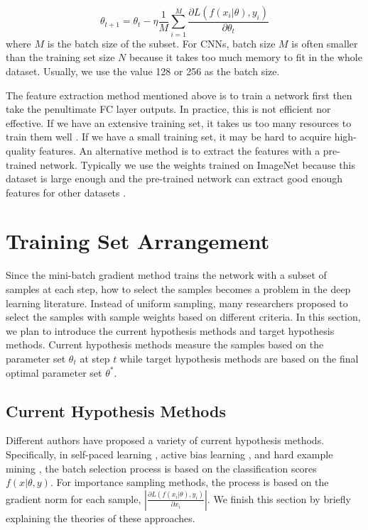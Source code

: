 \begin{equation}
	\theta_{t+1} = \theta_t - \eta \frac{1}{M} \sum_{i=1}^{M}
 \frac{\partial{L(f(x_i|\theta), y_i)}}{\partial{\theta_t}}
\end{equation}
where $M$ is the batch size of the subset. For CNNs, batch size $M$ is often smaller than the training set size $N$ because it takes too much memory to fit in the whole dataset. Usually, we use the value 128 or 256 as the batch size. 

The feature extraction method mentioned above is to train a network first then take the penultimate FC layer outputs. In practice, this is not efficient nor effective. If we have an extensive training set, it takes us too many resources to train them well \cite{Chen2016}. If we have a small training set, it may be hard to acquire high-quality features. An alternative method is to extract the features with a pre-trained network. Typically we use the weights trained on ImageNet \cite{Russakovsky2015} because this dataset is large enough and the pre-trained network can extract good enough features for other datasets \cite{Kornblith2018}.


\section{Training Set Arrangement}
Since the mini-batch gradient method trains the network with a subset of samples at each step, how to select the samples becomes a problem in the deep learning literature. Instead of uniform sampling, many researchers proposed to select the samples with sample weights based on different criteria. In this section, we plan to introduce the current hypothesis methods and target hypothesis methods. Current hypothesis methods measure the samples based on the parameter set $\theta_t$ at step $t$ while target hypothesis methods are based on the final optimal parameter set $\theta^*$. 

\subsection{Current Hypothesis Methods}
Different authors have proposed a variety of current hypothesis methods. Specifically, in self-paced learning \cite{Kumar2010, Li2017, Meng2016}, active bias learning \cite{Chang2017}, and hard example mining \cite{Shrivastava2016, Loshchilov2015}, the batch selection process is based on the classification scores $f(x|\theta, y)$. For importance sampling methods, the process is based on the gradient norm for each sample, $|\frac{\partial{L(f(x_i|\theta), y_i)}}{\partial{x_i}}|$. We finish this section by briefly explaining the theories of these approaches.

